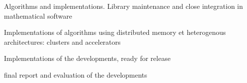 \begin{workpackage}
\begin{wpdelivs}
  \begin{wpdeliv}[due=24,id=LinBox-algo,dissem=PU,nature=DEM]
    {Algorithms and implementations. Library maintenance and close integration
      in mathematical software}
  \end{wpdeliv}
  \begin{wpdeliv}[due=36,id=LinBox-distributed,dissem=PU,nature=DEM]
    {Implementations of algorithms using distributed memory et heterogenous
      architectures: clusters and accelerators}
  \end{wpdeliv}
  \begin{wpdeliv}[due=47,id=GAP-software-final,dissem=PU,nature=OTHER]
      {Implementations of the \GAP developments, ready for release}
\end{wpdeliv}
  \begin{wpdeliv}[due=48,id=GAP-APIs-report,dissem=PU,nature=R]
      {final report and evaluation of the \GAP developments}
\end{wpdeliv}
\end{wpdelivs}
\end{workpackage}

